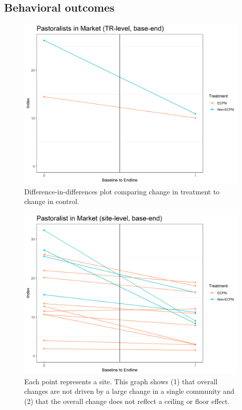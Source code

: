 \documentclass[
]{article}
\begin{document}
\hypertarget{behavioral-outcomes}{%
\subsection{Behavioral outcomes}\label{behavioral-outcomes}}

\begin{figure}[H]
\centering
\includegraphics[width=\linewidth]{../data_and_code/obs_dat/b_analysis/market_pasts_TrTime.plot.png}
\caption{Difference-in-differences plot comparing change in treatment to change in control.}\label{fig:market_past_TrTime}
\end{figure}

\begin{figure}[H]
\centering
\includegraphics[width=\linewidth]{../data_and_code/obs_dat/b_analysis/market_pasts_siteTime.plot.png}
\caption{Each point represents a site. This graph shows (1) that overall changes are not driven by a large change in a single community and (2) that the overall change does not reflect a ceiling or floor effect.}\label{fig:market_past_siteTime}
\end{figure}
\end{document}
